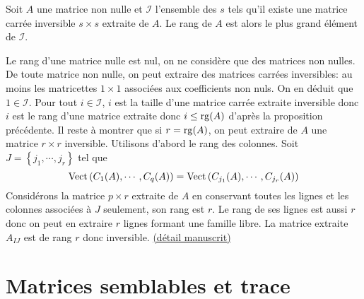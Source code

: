 \begin{propn} \label{prop: rgmatext}
  Soit $A$ une matrice non nulle et $\mathcal{I}$ l'ensemble des $s$ tels qu'il existe une matrice carrée inversible $s\times s$ extraite de $A$. Le rang de $A$ est alors le plus grand élément de $\mathcal{I}$.
\end{propn}
\begin{demo}
Le rang d'une matrice nulle est nul, on ne considère que des matrices non nulles. De toute matrice non nulle, on peut extraire des matrices carrées inversibles: au moins les matricettes $1\times 1$ associées aux coefficients non nuls. On en déduit que $1 \in \mathcal{I}$.\newline
Pour tout $i\in \mathcal{I}$, $i$ est la taille d'une matrice carrée extraite inversible donc $i$ est le rang d'une matrice extraite donc $i \leq \mathop{\mathrm{rg}}(A)$ d'après la proposition précédente.\newline
Il reste à montrer que si $r = \mathop{\mathrm{rg}}(A)$, on peut extraire de $A$ une matrice $r\times r$ inversible.\newline
Utilisons d'abord le rang des colonnes. Soit $J = \left\lbrace j_1, \cdots, j_r\right\rbrace $ tel que 
\[
 \mathop{\mathrm{Vect}}\left( C_1(A), \cdots, C_q(A)\right) = \mathop{\mathrm{Vect}}\left( C_{j_1}(A), \cdots, C_{j_r}(A)\right)
\]
Considérons la matrice $p\times r$ extraite de $A$ en conservant toutes les lignes et les colonnes associées à $J$ seulement, son rang est $r$. Le rang de ses lignes est aussi $r$ donc on peut en extraire $r$ lignes formant une famille libre. La matrice extraite $A_{I J}$ est de rang $r$ donc inversible. \href{https://maquisdoc-math.fra1.digitaloceanspaces.com/C2233_8.pdf}{(détail manuscrit)}
\end{demo}

\section{Matrices semblables et trace}
